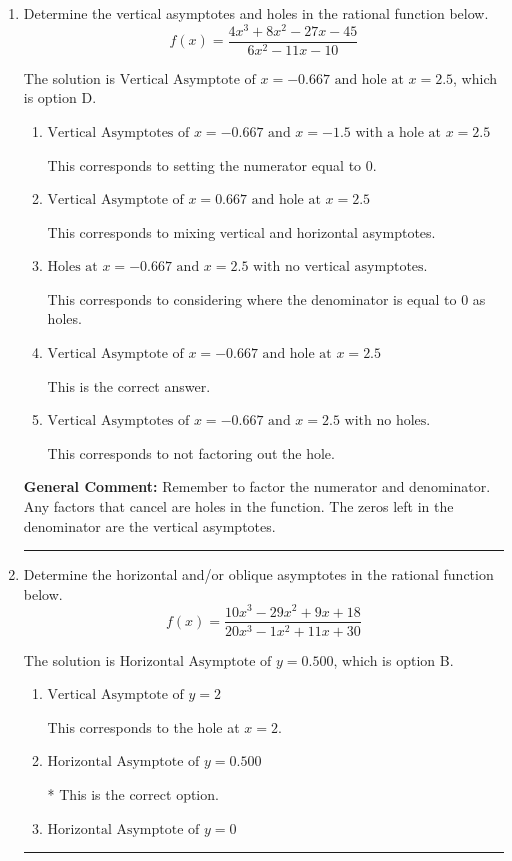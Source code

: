 \documentclass{extbook}[14pt]
\newcommand{\litem}[1]{\item #1

\rule{\textwidth}{0.4pt}}
\begin{document}
\begin{enumerate}\litem{
Determine the vertical asymptotes and holes in the rational function below.
\[ f(x) = \frac{4x^{3} +8 x^{2} -27 x -45}{6x^{2} -11 x -10} \]

The solution is \( \text{Vertical Asymptote of } x = -0.667 \text{ and hole at } x = 2.5 \), which is option D.\begin{enumerate}[label=\Alph*.]
\item \( \text{Vertical Asymptotes of } x = -0.667 \text{ and } x = -1.5 \text{ with a hole at } x = 2.5 \)

This corresponds to setting the numerator equal to 0.
\item \( \text{Vertical Asymptote of } x = 0.667 \text{ and hole at } x = 2.5 \)

This corresponds to mixing vertical and horizontal asymptotes.
\item \( \text{Holes at } x = -0.667 \text{ and } x = 2.5 \text{ with no vertical asymptotes.} \)

This corresponds to considering where the denominator is equal to 0 as holes.
\item \( \text{Vertical Asymptote of } x = -0.667 \text{ and hole at } x = 2.5 \)

This is the correct answer.
\item \( \text{Vertical Asymptotes of } x = -0.667 \text{ and } x = 2.5 \text{ with no holes.} \)

This corresponds to not factoring out the hole.
\end{enumerate}

\textbf{General Comment:} Remember to factor the numerator and denominator. Any factors that cancel are holes in the function. The zeros left in the denominator are the vertical asymptotes.
}
\litem{
Determine the horizontal and/or oblique asymptotes in the rational function below.
\[ f(x) = \frac{10x^{3} -29 x^{2} +9 x + 18}{20x^{3} -1 x^{2} +11 x + 30} \]

The solution is \( \text{Horizontal Asymptote of } y = 0.500  \), which is option B.\begin{enumerate}[label=\Alph*.]
\item \( \text{Vertical Asymptote of } y = 2  \)

This corresponds to the hole at $x = 2$.
\item \( \text{Horizontal Asymptote of } y = 0.500  \)

* This is the correct option.
\item \( \text{Horizontal Asymptote of } y = 0  \)


\end{enumerate}}
\end{enumerate}
\end{document}
